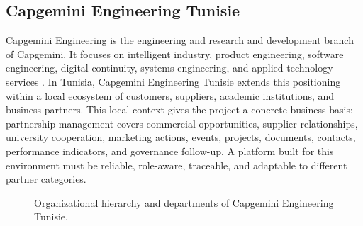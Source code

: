 \subsection{Capgemini Engineering Tunisie}
Capgemini Engineering is the engineering and research and development branch of Capgemini. It focuses on intelligent industry, product engineering, software engineering, digital continuity, systems engineering, and applied technology services . In Tunisia, Capgemini Engineering Tunisie extends this positioning within a local ecosystem of customers, suppliers, academic institutions, and business partners. This local context gives the project a concrete business basis: partnership management covers commercial opportunities, supplier relationships, university cooperation, marketing actions, events, projects, documents, contacts, performance indicators, and governance follow-up. A platform built for this environment must be reliable, role-aware, traceable, and adaptable to different partner categories.
\begin{figure}[htbp]
  \centering
  \caption{Organizational hierarchy and departments of Capgemini Engineering Tunisie.}
\end{figure}
